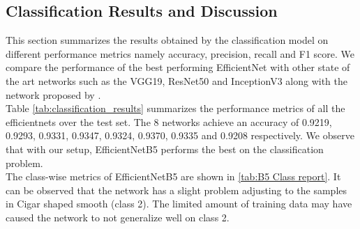 \documentclass[fleqn,usenatbib]{mnras}
\begin{document}
\subsection{Classification Results and Discussion}
\hspace*{0.25 in}This section summarizes the results obtained by the classification model on different performance metrics namely accuracy, precision, recall and F1 score. We compare the performance of the best performing EfficientNet with other state of the art networks such as the VGG19, ResNet50 and InceptionV3 along with the network proposed by \citet{dai2018galaxy}.\\

\hspace*{0.25 in}Table \ref{tab:classification_results} summarizes the performance metrics of all the efficientnets over the test set. The 8 networks achieve an accuracy of 0.9219, 0.9293, 0.9331, 0.9347, 0.9324, 0.9370, 0.9335 and 0.9208 respectively. We observe that with our setup, EfficientNetB5 performs the best on the classification problem.\\
\hspace*{0.25 in}The class-wise metrics of EfficientNetB5 are shown in \ref{tab:B5 Class report}. It can be observed that the network has a slight problem adjusting to the samples in Cigar shaped smooth (class 2). The limited amount of training data may have caused the network to not generalize well on class 2.

\begin{center}
    
\end{center}
\end{document}
